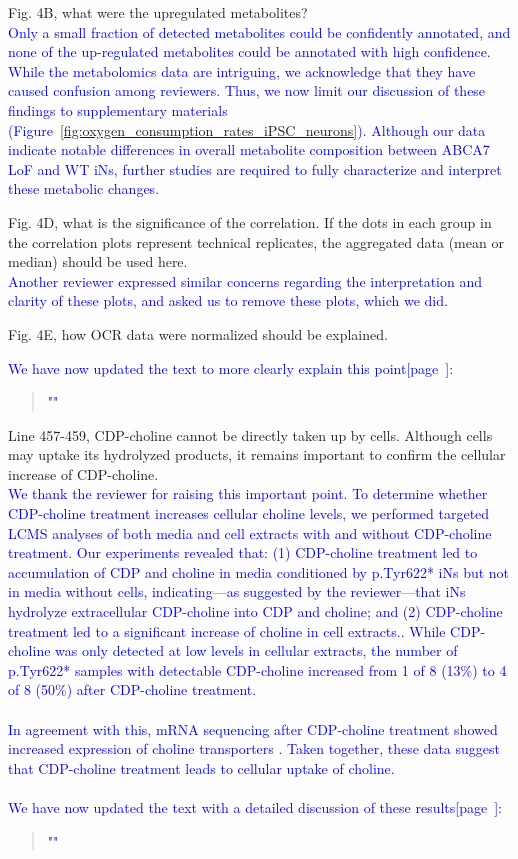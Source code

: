 Fig. 4B, what were the upregulated metabolites?\\
\textcolor{blue}{Only a small fraction of detected metabolites could be confidently annotated, and none of the up-regulated metabolites could be annotated with high confidence. While the metabolomics data are intriguing, we acknowledge that they have caused confusion among reviewers. Thus, we now limit our discussion of these findings to supplementary materials (Figure~\ref{fig:oxygen_consumption_rates_iPSC_neurons}). Although our data indicate notable differences in overall metabolite composition between ABCA7 LoF and WT iNs, further studies are required to fully characterize and interpret these metabolic changes.} 

Fig. 4D, what is the significance of the correlation. If the dots in each group in the correlation plots represent technical replicates, the aggregated data (mean or median) should be used here.\\
\textcolor{blue}{Another reviewer expressed similar concerns regarding the interpretation and clarity of these plots, and asked us to remove these plots, which we did.}

Fig. 4E, how OCR data were normalized should be explained.

\textcolor{blue}{We have now updated the text to more clearly explain this point[page~\pageref{quoteC-label}]:}
\begin{quote}
	\textcolor{blue}{"\quoteC"}
\end{quote}

Line 457-459, CDP-choline cannot be directly taken up by cells. Although cells may uptake its hydrolyzed products, it remains important to confirm the cellular increase of CDP-choline.\\
\textcolor{blue}{We thank the reviewer for raising this important point. To determine whether CDP-choline treatment increases cellular choline levels, we performed targeted LCMS analyses of both media and cell extracts with and without CDP-choline treatment. Our experiments revealed that: (1) CDP-choline treatment led to accumulation of CDP and choline in media conditioned by p.Tyr622* iNs but not in media without cells, indicating—as suggested by the reviewer—that iNs hydrolyze extracellular CDP-choline into CDP and choline; and (2) CDP-choline treatment led to a  significant increase of choline in cell extracts.. While CDP-choline was only detected at low levels in cellular extracts, the number of  p.Tyr622* samples with detectable CDP-choline increased from 1 of 8 (13\%) to 4 of 8 (50\%) after CDP-choline treatment.}\\\\
\textcolor{blue}{In agreement with this, mRNA sequencing after CDP-choline treatment showed increased expression of choline transporters . Taken together, these data suggest that CDP-choline treatment leads to cellular uptake of choline.}\\\\
\textcolor{blue}{We have now updated the text with a detailed discussion of these results[page~\pageref{quoteD-label}]:}
\begin{quote}
	\textcolor{blue}{"\quoteD"}
\end{quote}

